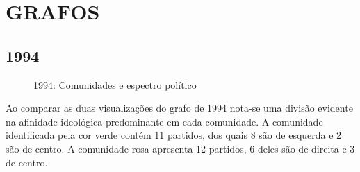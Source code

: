 \section{\texorpdfstring{\MakeUppercase{Grafos}}{}}
\label{resultados__grafos}


\subsection{1994}
\label{resultados__grafos--1994}

\begin{figure}[H]
\center
    \qquad

    \caption{1994: Comunidades e espectro político}
\end{figure}

Ao comparar as duas visualizações do grafo de 1994 nota-se uma divisão evidente na afinidade ideológica predominante em cada comunidade. A comunidade identificada pela cor verde contém 11 partidos, dos quais 8 são de esquerda e 2 são de centro. A comunidade rosa apresenta 12 partidos, 6 deles são de direita e 3 de centro.


